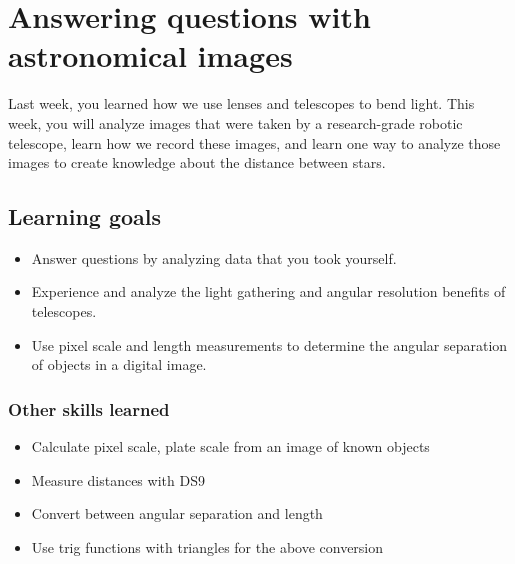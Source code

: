 \chapter{Answering questions with astronomical images}

Last week, you learned how we use lenses and telescopes to bend light. This week, you will analyze images that were taken by a research-grade robotic telescope, learn how we record these images, and learn one way to analyze those images to create knowledge about the distance between stars.


\section{Learning goals}

\begin{itemize}
	\item Answer questions by analyzing data that you took yourself.
	
	\item Experience and analyze the light gathering and angular resolution benefits of telescopes.
	
	\item Use pixel scale and length measurements to determine the angular separation of objects in a digital image.
	
\end{itemize}

\subsection{Other skills learned}
\begin{itemize}
	\item Calculate pixel scale, plate scale from an image of known objects
	\item Measure distances with DS9
	\item Convert between angular separation and length
	\item Use trig functions with triangles for the above conversion
\end{itemize}

